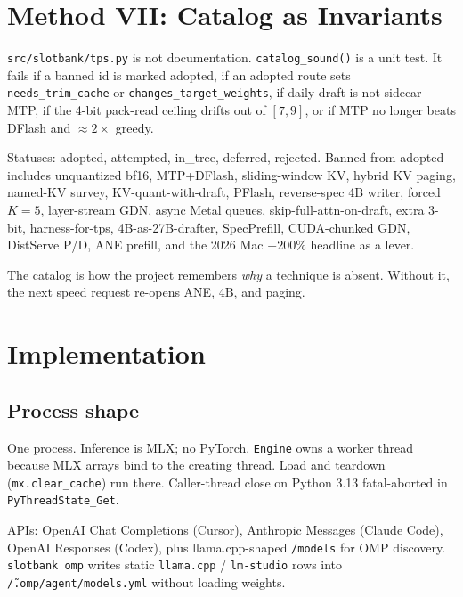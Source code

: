 \section{Method VII: Catalog as Invariants}
\label{sec:catalog}

\texttt{src/slotbank/tps.py} is not documentation. \texttt{catalog\_sound()} is a unit test. It fails if a banned id is marked adopted, if an adopted route sets \texttt{needs\_trim\_cache} or \texttt{changes\_target\_weights}, if daily draft is not sidecar MTP, if the 4-bit pack-read ceiling drifts out of $[7,9]$, or if MTP no longer beats DFlash and $\approx 2\times$ greedy.

Statuses: adopted, attempted, in\_tree, deferred, rejected. Banned-from-adopted includes unquantized bf16, MTP+DFlash, sliding-window KV, hybrid KV paging, named-KV survey, KV-quant-with-draft, PFlash, reverse-spec 4B writer, forced $K{=}5$, layer-stream GDN, async Metal queues, skip-full-attn-on-draft, extra 3-bit, harness-for-tps, 4B-as-27B-drafter, SpecPrefill, CUDA-chunked GDN, DistServe P/D, ANE prefill, and the 2026 Mac ${+}200\%$ headline as a lever.

The catalog is how the project remembers \emph{why} a technique is absent. Without it, the next speed request re-opens ANE, 4B, and paging.

\section{Implementation}
\label{sec:impl}

\subsection{Process shape}

One process. Inference is MLX; no PyTorch. \texttt{Engine} owns a worker thread because MLX arrays bind to the creating thread. Load and teardown (\texttt{mx.clear\_cache}) run there. Caller-thread close on Python 3.13 fatal-aborted in \texttt{PyThreadState\_Get}.

APIs: OpenAI Chat Completions (Cursor), Anthropic Messages (Claude Code), OpenAI Responses (Codex), plus llama.cpp-shaped \texttt{/models} for OMP discovery. \texttt{slotbank omp} writes static \texttt{llama.cpp} / \texttt{lm-studio} rows into \texttt{\~/.omp/agent/models.yml} without loading weights.

